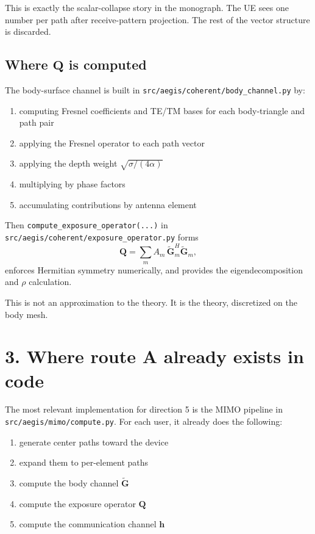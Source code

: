\documentclass[11pt]{article}
\newcommand{\hh}{\mathbf{h}}
\newcommand{\QQ}{\mathbf{Q}}
\newcommand{\Gh}{\widetilde{\mathbf{G}}}
\begin{document}
This is exactly the scalar-collapse story in the monograph. The UE sees one
number per path after receive-pattern projection. The rest of the vector
structure is discarded.

\subsection*{Where $\QQ$ is computed}

The body-surface channel is built in
\texttt{src/aegis/coherent/body\_channel.py} by:
\begin{enumerate}
  \item computing Fresnel coefficients and TE/TM bases for each
  body-triangle and path pair
  \item applying the Fresnel operator to each path vector
  \item applying the depth weight $\sqrt{\sigma/(4\alpha)}$
  \item multiplying by phase factors
  \item accumulating contributions by antenna element
\end{enumerate}

Then \texttt{compute\_exposure\_operator(...)} in
\texttt{src/aegis/coherent/exposure\_operator.py} forms
\begin{equation}
  \QQ = \sum_m A_m\,\Gh_m^H \Gh_m,
\end{equation}
enforces Hermitian symmetry numerically, and provides the eigendecomposition
and $\rho$ calculation.

This is not an approximation to the theory. It is the theory, discretized on
the body mesh.

\section*{3. Where route A already exists in code}

The most relevant implementation for direction 5 is the MIMO pipeline in
\texttt{src/aegis/mimo/compute.py}. For each user, it already does the
following:
\begin{enumerate}
  \item generate center paths toward the device
  \item expand them to per-element paths
  \item compute the body channel $\Gh$
  \item compute the exposure operator $\QQ$
  \item compute the communication channel $\hh$
\end{enumerate}
\end{document}
